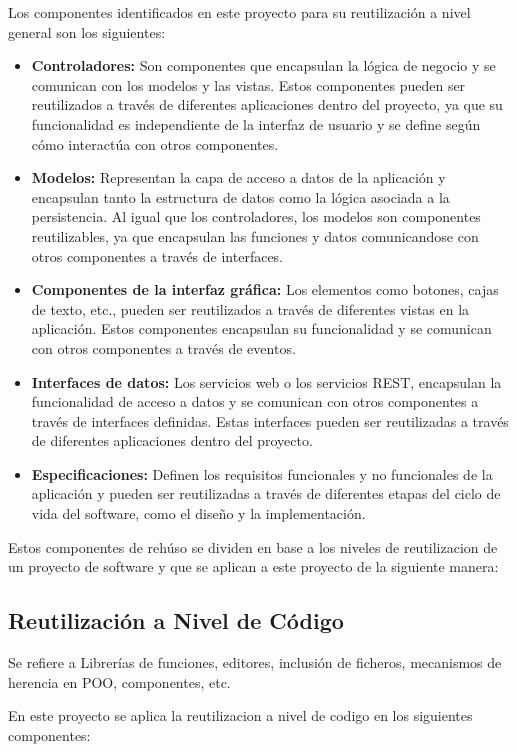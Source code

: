 \documentclass[runningheads]{llncs}
\begin{document}
Los componentes identificados en este proyecto para su reutilización a nivel general son los siguientes:
\begin{itemize}
    \item \textbf{Controladores: }Son componentes que encapsulan la lógica de negocio y se comunican con los modelos y las vistas. Estos componentes pueden ser reutilizados a través de diferentes aplicaciones dentro del proyecto, ya que su funcionalidad es independiente de la interfaz de usuario y se define según cómo interactúa con otros componentes.
    \item \textbf{Modelos: }Representan la capa de acceso a datos de la aplicación y encapsulan tanto la estructura de datos como la lógica asociada a la persistencia. Al igual que los controladores, los modelos son componentes reutilizables, ya que encapsulan las funciones y datos comunicandose con otros componentes a través de interfaces.
    \item \textbf{Componentes de la interfaz gráfica: }Los elementos como botones, cajas de texto, etc., pueden ser reutilizados a través de diferentes vistas en la aplicación. Estos componentes encapsulan su funcionalidad y se comunican con otros componentes a través de eventos.
    \item \textbf{Interfaces de datos: }Los servicios web o los servicios REST, encapsulan la funcionalidad de acceso a datos y se comunican con otros componentes a través de interfaces definidas. Estas interfaces pueden ser reutilizadas a través de diferentes aplicaciones dentro del proyecto.
    \item \textbf{Especificaciones: }Definen los requisitos funcionales y no funcionales de la aplicación y pueden ser reutilizadas a través de diferentes etapas del ciclo de vida del software, como el diseño y la implementación.
\end{itemize}   

Estos componentes de rehúso se dividen en base a los niveles de reutilizacion de un proyecto de software y que se aplican a este proyecto de la siguiente manera:

\subsection*{Reutilización a Nivel de Código}

Se refiere a Librerías de funciones, editores, inclusión de ficheros, mecanismos de herencia en POO, componentes, etc.

En este proyecto se aplica la reutilizacion a nivel de codigo en los siguientes componentes:
\end{document}
